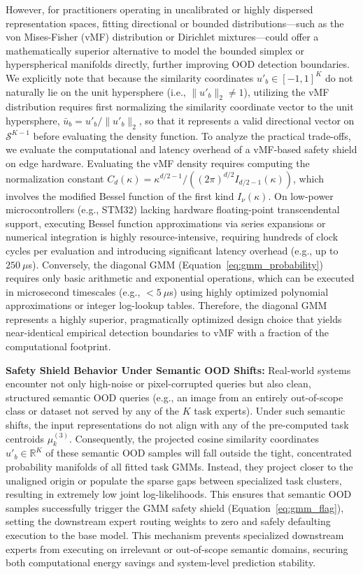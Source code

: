 However, for practitioners operating in uncalibrated or highly dispersed representation spaces, fitting directional or bounded distributions---such as the von Mises-Fisher (vMF) distribution or Dirichlet mixtures---could offer a mathematically superior alternative to model the bounded simplex or hyperspherical manifolds directly, further improving OOD detection boundaries. We explicitly note that because the similarity coordinates $u'_b \in [-1, 1]^K$ do not naturally lie on the unit hypersphere (i.e., $\|u'_b\|_2 \ne 1$), utilizing the vMF distribution requires first normalizing the similarity coordinate vector to the unit hypersphere, $\bar{u}_b = u'_b / \|u'_b\|_2$, so that it represents a valid directional vector on $\mathcal{S}^{K-1}$ before evaluating the density function. To analyze the practical trade-offs, we evaluate the computational and latency overhead of a vMF-based safety shield on edge hardware. Evaluating the vMF density requires computing the normalization constant $C_d(\kappa) = \kappa^{d/2 - 1} / ((2\pi)^{d/2} I_{d/2 - 1}(\kappa))$, which involves the modified Bessel function of the first kind $I_{\nu}(\kappa)$. On low-power microcontrollers (e.g., STM32) lacking hardware floating-point transcendental support, executing Bessel function approximations via series expansions or numerical integration is highly resource-intensive, requiring hundreds of clock cycles per evaluation and introducing significant latency overhead (e.g., up to $250\ \mu$s). Conversely, the diagonal GMM (Equation~\ref{eq:gmm_probability}) requires only basic arithmetic and exponential operations, which can be executed in microsecond timescales (e.g., $<5\ \mu$s) using highly optimized polynomial approximations or integer log-lookup tables. Therefore, the diagonal GMM represents a highly superior, pragmatically optimized design choice that yields near-identical empirical detection boundaries to vMF with a fraction of the computational footprint.

\textbf{Safety Shield Behavior Under Semantic OOD Shifts:} Real-world systems encounter not only high-noise or pixel-corrupted queries but also clean, structured semantic OOD queries (e.g., an image from an entirely out-of-scope class or dataset not served by any of the $K$ task experts). Under such semantic shifts, the input representations do not align with any of the pre-computed task centroids $\mu_k^{(3)}$. Consequently, the projected cosine similarity coordinates $u'_{b} \in \mathbb{R}^K$ of these semantic OOD samples will fall outside the tight, concentrated probability manifolds of all fitted task GMMs. Instead, they project closer to the unaligned origin or populate the sparse gaps between specialized task clusters, resulting in extremely low joint log-likelihoods. This ensures that semantic OOD samples successfully trigger the GMM safety shield (Equation~\ref{eq:gmm_flag}), setting the downstream expert routing weights to zero and safely defaulting execution to the base model. This mechanism prevents specialized downstream experts from executing on irrelevant or out-of-scope semantic domains, securing both computational energy savings and system-level prediction stability.

